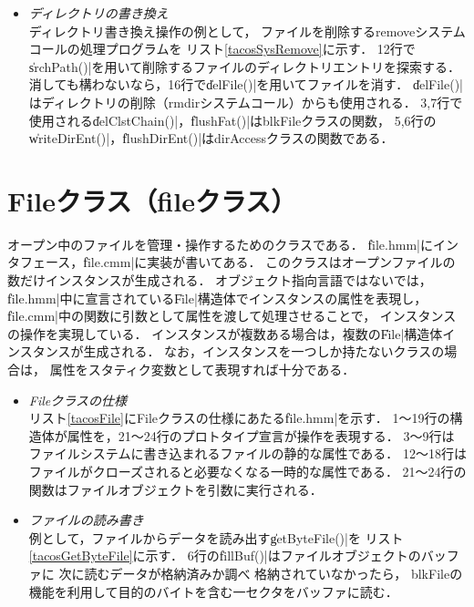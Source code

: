 \begin{itemize}
\item \emph{ディレクトリの書き換え} \\
  ディレクトリ書き換え操作の例として，
  ファイルを削除するremoveシステムコールの処理プログラムを
  リスト\ref{tacosSysRemove}に示す．
  12行で\|srchPath()|を用いて削除するファイルのディレクトリエントリを探索する．
  消しても構わないなら，16行で\|delFile()|を用いてファイルを消す．
  \|delFile()|はディレクトリの削除（rmdirシステムコール）からも使用される．
  3,7行で使用される\|delClstChain()|，\|flushFat()|はblkFileクラスの関数，
  5,6行の\|writeDirEnt()|，\|flushDirEnt()|はdirAccessクラスの関数である．

  

\end{itemize}

\section{Fileクラス（fileクラス）}
オープン中のファイルを管理・操作するためのクラスである．
\|file.hmm|にインタフェース，\|file.cmm|に実装が書いてある．
このクラスはオープンファイルの数だけインスタンスが生成される．
オブジェクト指向言語ではない{\cmm}では，
\|file.hmm|中に宣言されている\|File|構造体でインスタンスの属性を表現し，
\|file.cmm|中の関数に引数として属性を渡して処理させることで，
インスタンスの操作を実現している．
インスタンスが複数ある場合は，複数の\|File|構造体インスタンスが生成される．
なお，インスタンスを一つしか持たないクラスの場合は，
属性をスタティク変数として表現すれば十分である．

\begin{itemize}
\item \emph{Fileクラスの仕様}\\
  リスト\ref{tacosFile}にFileクラスの仕様にあたる\|file.hmm|を示す．
  1〜19行の構造体が属性を，21〜24行のプロトタイプ宣言が操作を表現する．
  3〜9行はファイルシステムに書き込まれるファイルの静的な属性である．
  12〜18行はファイルがクローズされると必要なくなる一時的な属性である．
  21〜24行の関数はファイルオブジェクトを引数に実行される．

  

\item \emph{ファイルの読み書き}\\
  例として，ファイルからデータを読み出す\|getByteFile()|を
  リスト\ref{tacosGetByteFile}に示す．
  6行の\|fillBuf()|はファイルオブジェクトのバッファに
  次に読むデータが格納済みか調べ  格納されていなかったら，
  blkFileの機能を利用して目的のバイトを含む一セクタをバッファに読む．
  
  

\end{itemize}

